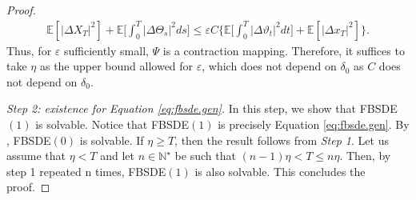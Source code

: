 \documentclass[11pt,reqno]{amsart}
\numberwithin{equation}{section}
\theoremstyle{definition}
\def\E{{\mathbb E}}
\def\N{{\mathbb N}}
\def \E{\mathbb{E}}
\def \N{\mathbb{N}}
\def \e{\mathrm{e}}
\begin{document}
\begin{proof}
  \begin{align*}
    \E[|\Delta X_T|^2] + \E\bigg[\int_0^T|\Delta \Theta_s|^2ds\bigg]
     \le \varepsilon C%
     \bigg\{ \E\bigg[\int_0^T|\Delta \vartheta_t|^2dt\bigg] + \E[|\Delta x_T|^2]\bigg\}.
  \end{align*}
  Thus, for $\varepsilon$ sufficiently small, $\Psi$ is a contraction mapping.
  Therefore, it suffices to take $\eta$ as the upper bound allowed for $\varepsilon$, which does not depend on $\delta_0$ as $C$ does not depend on $\delta_0$.

  \medskip

  \emph{Step 2: existence for Equation \eqref{eq:fbsde.gen}.} In this step, we show that FBSDE$(1)$ is solvable.
  Notice that FBSDE$(1)$ is precisely Equation \eqref{eq:fbsde.gen}.
  By \cite[Lemma 8.4.3]{Zhang}, FBSDE$(0)$ is solvable.
  If $\eta\ge T$, then the result follows from \emph{Step 1}.
  Let us assume that $\eta<T$ and let $n\in \N^\star$ be such that $(n-1)\eta<T \le n\eta$.
  Then, by step 1 repeated n times, FBSDE$(1)$ is also solvable.
  This concludes the proof.
\end{proof}
\end{document}

